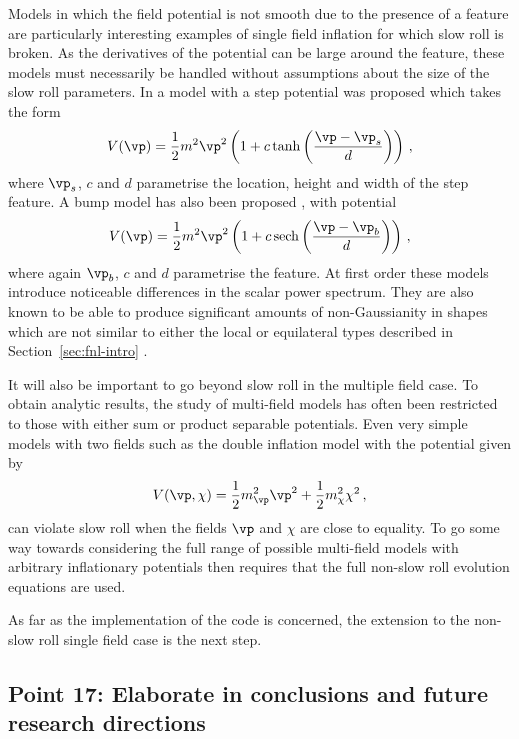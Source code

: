 Models in which the field potential is not smooth due to the presence of a feature are
particularly interesting examples of single field inflation for which slow roll is broken. 
As the
derivatives of the potential can be large around the feature, these models must necessarily be
handled without assumptions about the size of the slow roll parameters. 
In  a model with a step potential was proposed which takes the form
% 
\begin{equation}
 V(\vp) = \frac{1}{2}m^2\vp^2\left(1 + c\tanh\left(\frac{\vp -\vp_s}{d}\right)\right)\,,
\end{equation}
% 
where $\vp_s$, $c$ and $d$ parametrise the location, height and width of the step feature. A bump
model has also been proposed \cite{Chen:2008wn}, with potential 
% 
\begin{equation}
 V(\vp) = \frac{1}{2}m^2\vp^2\left(1 + c\,\mathrm{sech}\left(\frac{\vp-\vp_b}{d}\right)\right)\,,
\end{equation}
% 
where again $\vp_b$, $c$ and $d$ parametrise the feature. At first order these models introduce
noticeable differences in the scalar power spectrum. They are also known to be able to produce
significant amounts of non-Gaussianity in shapes which are not similar to either the local or
equilateral types described in Section~\ref{sec:fnl-intro} \cite{Chen:2006xjb, Chen:2008wn}.


It will also be important to go beyond slow roll in the multiple field case.
To obtain analytic results, the study of multi-field models has often been restricted to those with
either sum or product separable potentials. Even very simple
models with two fields such as the double inflation model with the potential given by
\cite{Turner:1986te, Silk:1986vc}
% 
\begin{equation}
 V(\vp,\chi) = \frac{1}{2}m_\vp^2\vp^2 + \frac{1}{2}m_\chi^2 \chi^2\,,
\end{equation}
% 
can violate slow roll when the fields $\vp$ and $\chi$ are close to
equality. To go some way towards considering the full range of possible multi-field models with
arbitrary inflationary potentials then requires that the full non-slow roll evolution equations are
used.


As far as the implementation of the code is concerned, the extension to the non-slow roll single
field case is the next step.


\subsection{Point 17: Elaborate in conclusions and future research directions}

